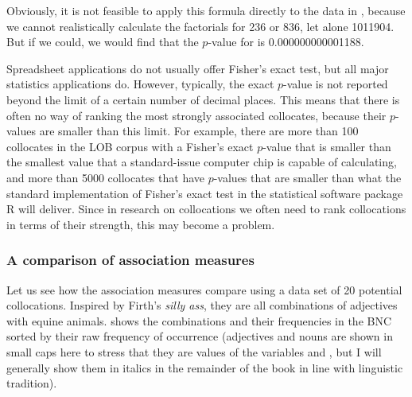 Obviously, it is not feasible to apply this formula directly to the data in , because we cannot realistically calculate the factorials for 236 or 836, let alone \num{1011904}. But if we could, we would find that the $p$-value for  is 0.000000000001188.

Spreadsheet applications do not usually offer Fisher's exact test,  but all major statistics  applications do. However, typically, the exact $p$-value is not reported beyond the limit of a certain number of decimal places. This means that there is often no way of ranking the most strongly associated  collocates,  because their $p$-values are smaller than this limit. For example, there are more than 100 collocates in the LOB  corpus with a Fisher's exact $p$-value  that is smaller than the smallest value that a standard\hyp{}issue computer chip is capable of calculating, and more than 5000 collocates that have $p$-values that are smaller than what the standard implementation of Fisher's exact test in the statistical software package R will deliver. Since in research on collocations  we often need to rank collocations in terms of their strength, this may become a problem.

\subsubsection{A comparison of association measures}
\label{sec:amcomparison}

Let us see how the association measures compare using a data set of 20 potential collocations.  Inspired by Firth's \textit{silly ass}, they are all combinations of adjectives  with equine animals.  shows the combinations and their frequencies  in the BNC  sorted by their raw frequency of occurrence (adjectives  and nouns  are shown in small caps here to stress that they are values of the variables  and , but I will generally show them in italics in the remainder of the book in line with linguistic tradition).

